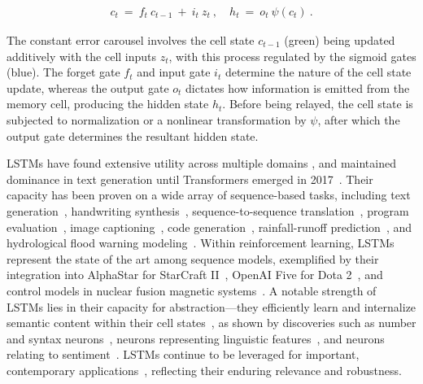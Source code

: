 \begin{align}
\label{eq:lstm_idea}
  c_t \ = \ f_t \ c_{t-1} \ + \ 
          i_t \  z_t \ , \quad  
          h_t \ = \ o_t \ \psi({c_t}) \ . 
\end{align}

The constant error carousel involves the cell state $c_{t-1}$ (green) being updated additively with the cell inputs $z_t$, with this process regulated by the sigmoid gates (blue). The forget gate $f_t$ and input gate $i_t$ determine the nature of the cell state update, whereas the output gate $o_t$ dictates how information is emitted from the memory cell, producing the hidden state $h_t$. Before being relayed, the cell state is subjected to normalization or a nonlinear transformation by $\psi$, after which the output gate determines the resultant hidden state.

LSTMs have found extensive utility across multiple domains \citep{Hochreiter:01,Hochreiter:07,Schmidhuber:15}, and maintained dominance in text generation until Transformers emerged in 2017~\citep{Vaswani:17}. Their capacity has been proven on a wide array of sequence-based tasks, including text generation~\citep{Graves:13,Karpathy:15blog}, handwriting synthesis~\citep{Graves:13}, sequence-to-sequence translation~\citep{Sutskever:14nips}, program evaluation~\citep{Zaremba:14arxiv}, image captioning~\citep{Karpathy:15,Hossain:19}, code generation~\citep{Karpathy:15blog}, rainfall-runoff prediction~\citep{Kratzert:18,Kratzert:19}, and hydrological flood warning modeling~\citep{Nearing:24}. Within reinforcement learning, LSTMs represent the state of the art among sequence models, exemplified by their integration into AlphaStar for StarCraft II~\citep{Vinyals:17short}, OpenAI Five for Dota 2~\citep{OpenAI:19}, and control models in nuclear fusion magnetic systems~\citep{Degrave:22short}. A notable strength of LSTMs lies in their capacity for abstraction—they efficiently learn and internalize semantic content within their cell states~\citep{Karpathy:15blog}, as shown by discoveries such as number and syntax neurons~\citep{Lakretz:19}, neurons representing linguistic features~\citep{Bau:19}, and neurons relating to sentiment~\citep{Radford:17arxiv}. LSTMs continue to be leveraged for important, contemporary applications~\citep{Degrave:22short,Nearing:24}, reflecting their enduring relevance and robustness.

